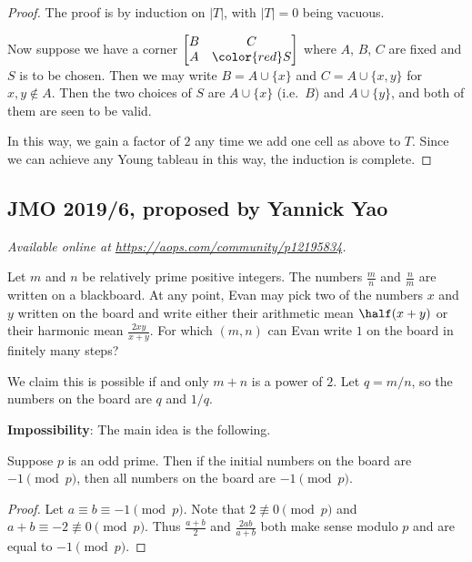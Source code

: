 \documentclass[11pt]{scrartcl}
\begin{document}
\begin{proof}
  The proof is by induction on $|T|$,
  with $|T| = 0$ being vacuous.

  Now suppose we have a corner $\begin{bmatrix}
  B & C \\ A & {\color{red}S} \end{bmatrix}$
  where $A$, $B$, $C$ are fixed and $S$ is to be chosen.
  Then we may write $B = A \cup \{x\}$ and $C = A \cup \{x,y\}$
  for $x,y \notin A$.
  Then the two choices of $S$ are $A \cup \{x\}$ (i.e.\ $B$)
  and $A \cup \{y\}$, and both of them are seen to be valid.

  In this way, we gain a factor of $2$
  any time we add one cell as above to $T$.
  Since we can achieve any Young tableau in this way,
  the induction is complete.
\end{proof}
\pagebreak

\subsection{JMO 2019/6, proposed by Yannick Yao}
\textsl{Available online at \url{https://aops.com/community/p12195834}.}
\begin{mdframed}[style=mdpurplebox,frametitle={Problem statement}]
Let $m$ and $n$ be relatively prime positive integers.
The numbers $\frac mn$ and $\frac nm$ are written on a blackboard.
At any point, Evan may pick two of the numbers $x$ and $y$
written on the board and write either their arithmetic mean $\half(x+y)$
or their harmonic mean $\frac{2xy}{x+y}$.
For which $(m,n)$ can Evan write $1$ on the board in finitely many steps?
\end{mdframed}
We claim this is possible if and only $m+n$ is a power of $2$.
Let $q = m/n$, so the numbers on the board
are $q$ and $1/q$.

\textbf{Impossibility}:
The main idea is the following.
\begin{claim*}
  Suppose $p$ is an odd prime.
  Then if the initial numbers on the board are $-1 \pmod p$,
  then all numbers on the board are $-1 \pmod p$.
\end{claim*}
\begin{proof}
  Let $a \equiv b \equiv -1 \pmod p$.
  Note that $2 \not\equiv 0 \pmod p$
  and $a+b \equiv -2 \not\equiv 0 \pmod p$.
  Thus $\frac{a+b}{2}$ and $\frac{2ab}{a+b}$
  both make sense modulo $p$ and are equal to $-1 \pmod p$.
\end{proof}
\end{document}
